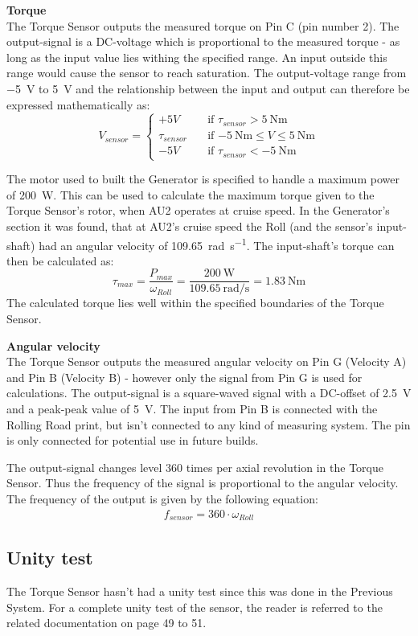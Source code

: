 \textbf{Torque}\\
The Torque Sensor outputs the measured torque on Pin C (pin number 2). The output-signal is a DC-voltage which is proportional to the measured torque - as long as the input value lies withing the specified range. An input outside this range would cause the sensor to reach saturation. The output-voltage range from \SI{-5}{\volt} to \SI{+5}{\volt} and the relationship between the input and output can therefore be expressed mathematically as:
\begin{equation}
	V_{sensor} = 
	\begin{cases}
		+5V				& \quad \text{if } \tau_{sensor} > \SI{+5}{\newton \meter}\\
		\tau_{sensor}   & \quad \text{if } \SI{-5}{\newton \meter} \leq V \leq \SI{+5}{\newton \meter}\\
		-5V				& \quad \text{if } \tau_{sensor} < \SI{-5}{\newton \meter}
	\end{cases}
\end{equation}

The motor used to built the Generator is specified to handle a maximum power of \SI{200}{\watt}. This can be used to calculate the maximum torque given to the Torque Sensor's rotor, when AU2 operates at cruise speed. In the Generator's section it was found, that at AU2's cruise speed the Roll (and the sensor's input-shaft) had an angular velocity of \SI[per-mode=fraction]{109.65}{\radian \per \second}. The input-shaft's torque can then be calculated as:
\begin{equation}
	\tau_{max} = \frac{P_{max}}{\omega_{Roll}} = \frac{\SI{200}{\watt}}{\SI[per-mode=fraction]{109.65}{\radian \per \second}} = \SI{1.83}{\newton \meter}
\end{equation}
The calculated torque lies well within the specified boundaries of the Torque Sensor.

\textbf{Angular velocity}\\
The Torque Sensor outputs the measured angular velocity on Pin G (Velocity A) and Pin B (Velocity B) - however only the signal from Pin G is used for calculations. The output-signal is a square-waved signal with a DC-offset of \SI{2.5}{\volt} and a peak-peak value of \SI{5}{\volt}. The input from Pin B is connected with the Rolling Road print, but isn't connected to any kind of measuring system. The pin is only connected for potential use in future builds.

The output-signal changes level 360 times per axial revolution in the Torque Sensor. Thus the frequency of the signal is proportional to the angular velocity. The frequency of the output is given by the following equation:
\begin{equation}
	\begin{split}
		f_{sensor} = 360 \cdot \omega_{Roll}
	\end{split}
\end{equation}

\subsection{Unity test}
The Torque Sensor hasn't had a unity test since this was done in the Previous System\cite{BAC_rullefelt}. For a complete unity test of the sensor, the reader is referred to the related documentation on page 49 to 51.